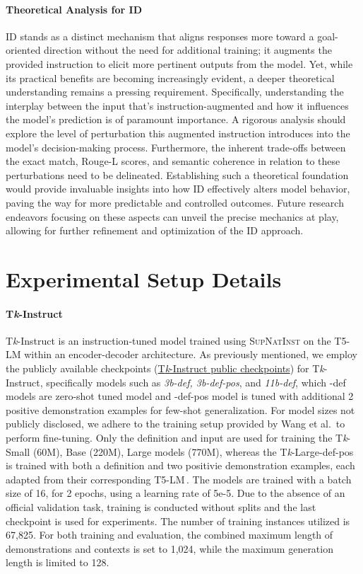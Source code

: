 \paragraph{Theoretical Analysis for ID}
ID stands as a distinct mechanism that aligns responses more toward a goal-oriented direction without the need for additional training; it augments the provided instruction to elicit more pertinent outputs from the model. Yet, while its practical benefits are becoming increasingly evident, a deeper theoretical understanding remains a pressing requirement. Specifically, understanding the interplay between the input that's instruction-augmented and how it influences the model's prediction is of paramount importance. A rigorous analysis should explore the level of perturbation this augmented instruction introduces into the model's decision-making process. Furthermore, the inherent trade-offs between the exact match, Rouge-L scores, and semantic coherence in relation to these perturbations need to be delineated. Establishing such a theoretical foundation would provide invaluable insights into how ID effectively alters model behavior, paving the way for more predictable and controlled outcomes. Future research endeavors focusing on these aspects can unveil the precise mechanics at play, allowing for further refinement and optimization of the ID approach.

\section{Experimental Setup Details}
\label{sec:futher_exp}
\paragraph{T\textit{k}-Instruct}
T\textit{k}-Instruct is an instruction-tuned model trained using \textsc{SupNatInst} on the T5-LM within an encoder-decoder architecture. As previously mentioned, we employ the publicly available checkpoints (\href{https://huggingface.co/models?search=allenai/tk-instruct}{T\textit{k}-Instruct public checkpoints}) for T\textit{k}-Instruct, specifically models such as \textit{3b-def, 3b-def-pos}, and \textit{11b-def}, which -def models are zero-shot tuned model and -def-pos model is tuned with additional 2 positive demonstration examples for few-shot generalization. For model sizes not publicly disclosed, we adhere to the training setup provided by Wang et al.\,\citep{sni_dataset} to perform fine-tuning. Only the definition and input are used for training the T\textit{k}-Small (60M), Base (220M), Large models (770M), whereas the T\textit{k}-Large-def-pos is trained with both a definition and two positivie demonstration examples, each adapted from their corresponding T5-LM\,\citep{t5-lm}. The models are trained with a batch size of 16, for 2 epochs, using a learning rate of 5e-5. Due to the absence of an official validation task, training is conducted without splits and the last checkpoint is used for experiments. The number of training instances utilized is 67,825. For both training and evaluation, the combined maximum length of demonstrations and contexts is set to 1,024, while the maximum generation length is limited to 128.

